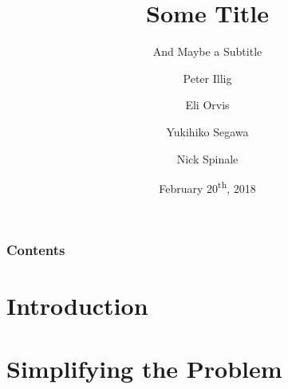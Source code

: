 \documentclass{beamer}
\title{Some Title}
\subtitle{And Maybe a Subtitle}
\author[Illig \and Orvis \and Segawa \and Spinale]{Peter Illig \and Eli Orvis \and Yukihiko Segawa \and Nick Spinale}
\institute[Carleton]{Carleton College}
\date{February 20\textsuperscript{th}, 2018}
\begin{document}
\newtheorem{thm}{Theorem}[section]
\newtheorem{prop}[thm]{Proposition}
\newtheorem{cor}[thm]{Corollary}
\newtheorem{obs}[thm]{Observation}
\newtheorem{defn}[thm]{Definition}
\newtheorem{exmp}[thm]{Example}
\newtheorem{remk}[thm]{Remark}

\maketitle

\begin{frame}
  \frametitle{Contents}
  \tableofcontents
\end{frame}

\section{Introduction}



\section{Simplifying the Problem}


\end{document}
